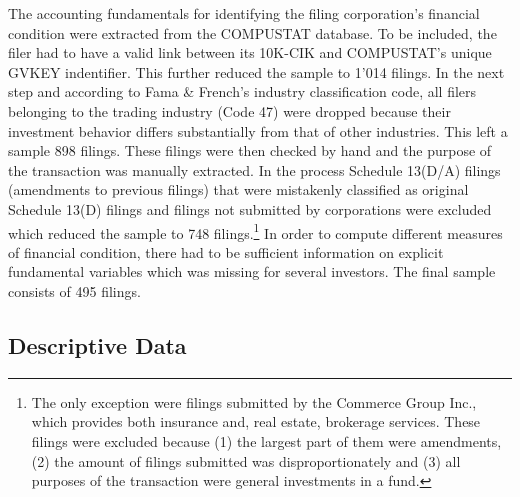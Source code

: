 \documentclass[12pt]{article}
\begin{document}
The accounting fundamentals for identifying the filing corporation's financial condition were extracted from the COMPUSTAT database. To be included, the filer had to have a valid link between its 10K-CIK and COMPUSTAT's unique GVKEY indentifier. This further reduced the sample to 1'014 filings. In the next step and according to Fama \& French's industry classification code, all filers belonging to the trading industry (Code 47) were dropped because their investment behavior differs substantially from that of other industries. This left a sample 898 filings. These filings were then checked by hand and the  purpose of the transaction was manually extracted. In the process Schedule 13(D/A) filings (amendments to previous filings) that were mistakenly classified as original Schedule 13(D) filings and filings not submitted by corporations were excluded which reduced the sample to 748 filings.\footnote{The only exception were filings submitted by the Commerce Group Inc., which provides both insurance and, real estate, brokerage services. These filings were excluded because (1) the largest part of them were amendments, (2) the amount of filings submitted was disproportionately and (3) all purposes of the transaction were general investments in a fund.} In order to compute different measures of financial condition, there had to be sufficient information on explicit fundamental variables which was missing for several investors. The final sample consists of 495 filings. 

\subsection{Descriptive Data}
\end{document}
